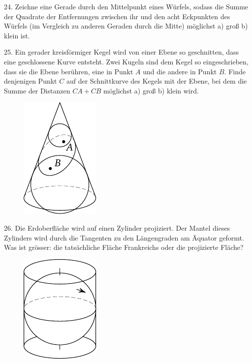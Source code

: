 \begin{problem}{24.}
	Zeichne eine Gerade durch den Mittelpunkt eines Würfels, sodass die Summe der Quadrate der Entfernungen zwischen ihr und den acht Eckpunkten des Würfels (im Vergleich zu anderen Geraden durch die Mitte) möglichst a) groß b) klein ist.
\end{problem}

\begin{problem}{25.}
	Ein gerader kreisförmiger Kegel wird von einer Ebene so geschnitten, dass eine geschlossene Kurve entsteht. Zwei Kugeln sind dem Kegel so eingeschrieben, dass sie die Ebene berühren, eine in Punkt $A$ und die andere in Punkt $B$. Finde denjenigen Punkt $C$ auf der Schnittkurve des Kegels mit der Ebene, bei dem die Summe der Distanzen $CA + CB$ möglichst a) groß b) klein wird.
	\begin{figure}
		\includegraphics{resources/taskbook-9}
	\end{figure}
\end{problem}

\begin{problem}{26.}
	Die Erdoberfläche wird auf einen Zylinder projiziert. Der Mantel dieses Zylinders wird durch die Tangenten zu den Längengraden am Äquator geformt. Was ist grösser: die tatsächliche Fläche Frankreichs oder die projizierte Fläche?
	\begin{figure}
		\includegraphics{resources/taskbook-10}
	\end{figure}
\end{problem}

